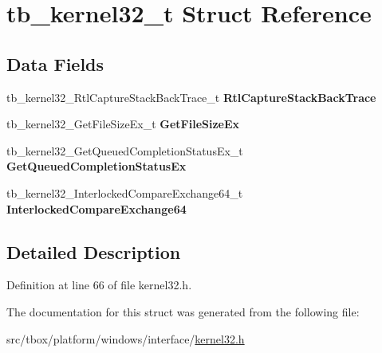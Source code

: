 \hypertarget{structtb__kernel32__t}{\section{tb\-\_\-kernel32\-\_\-t Struct Reference}
\label{structtb__kernel32__t}
}
\subsection*{Data Fields}
\begin{DoxyCompactItemize}
\item 
\hypertarget{structtb__kernel32__t_a21fbee9bec40892a57a65dac8b6adec2}{tb\-\_\-kernel32\-\_\-\-Rtl\-Capture\-Stack\-Back\-Trace\-\_\-t {\bfseries Rtl\-Capture\-Stack\-Back\-Trace}}\label{structtb__kernel32__t_a21fbee9bec40892a57a65dac8b6adec2}

\item 
\hypertarget{structtb__kernel32__t_ab67c241f443d39f528606e9582049d44}{tb\-\_\-kernel32\-\_\-\-Get\-File\-Size\-Ex\-\_\-t {\bfseries Get\-File\-Size\-Ex}}\label{structtb__kernel32__t_ab67c241f443d39f528606e9582049d44}

\item 
\hypertarget{structtb__kernel32__t_aee1d18d7672e631db9b771d44af637e6}{tb\-\_\-kernel32\-\_\-\-Get\-Queued\-Completion\-Status\-Ex\-\_\-t {\bfseries Get\-Queued\-Completion\-Status\-Ex}}\label{structtb__kernel32__t_aee1d18d7672e631db9b771d44af637e6}

\item 
\hypertarget{structtb__kernel32__t_aa6dbc0c5b9e8e9b28429eec855f088a6}{tb\-\_\-kernel32\-\_\-\-Interlocked\-Compare\-Exchange64\-\_\-t {\bfseries Interlocked\-Compare\-Exchange64}}\label{structtb__kernel32__t_aa6dbc0c5b9e8e9b28429eec855f088a6}

\end{DoxyCompactItemize}


\subsection{Detailed Description}


Definition at line 66 of file kernel32.\-h.



The documentation for this struct was generated from the following file\-:\begin{DoxyCompactItemize}
\item 
src/tbox/platform/windows/interface/\hyperlink{kernel32_8h}{kernel32.\-h}\end{DoxyCompactItemize}
